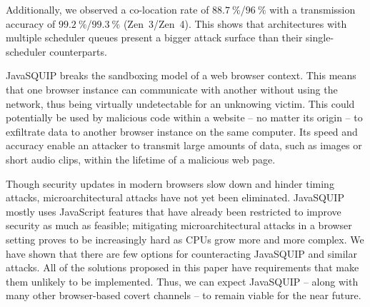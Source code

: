 \documentclass[11pt,
  titlepage=false,
  parskip=half,      %
]{scrreprt}
\begin{document}
Additionally, we observed a co-location rate of $88.7~\%$/$96~\%$ with a transmission accuracy of $99.2~\%$/$99.3~\%$ (Zen~3/Zen~4).
This shows that architectures with multiple scheduler queues present a bigger attack surface than their single-scheduler counterparts.

JavaSQUIP breaks the sandboxing model of a web browser context.
This means that one browser instance can communicate with another without using the network, thus being virtually undetectable for an unknowing victim.
This could potentially be used by malicious code within a website -- no matter its origin -- to exfiltrate data to another browser instance on the same computer.
Its speed and accuracy enable an attacker to transmit large amounts of data, such as images or short audio clips, within the lifetime of a malicious web page.

Though security updates in modern browsers slow down and hinder timing attacks, microarchitectural attacks have not yet been eliminated.
JavaSQUIP mostly uses JavaScript features that have already been restricted to improve security as much as feasible;
mitigating microarchitectural attacks in a browser setting proves to be increasingly hard as CPUs grow more and more complex.
We have shown that there are few options for counteracting JavaSQUIP and similar attacks.
All of the solutions proposed in this paper have requirements that make them unlikely to be implemented.
Thus, we can expect JavaSQUIP -- along with many other browser-based covert channels --
to remain viable for the near future.


\pagebreak
\printbibliography
\end{document}
